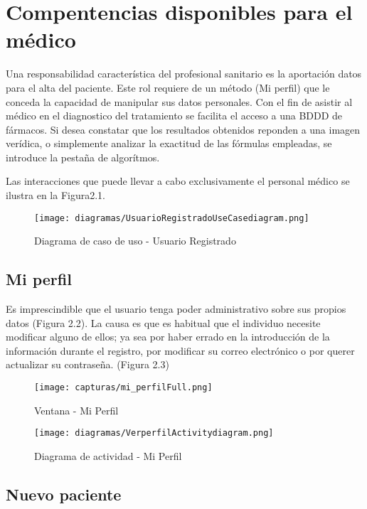 \documentclass[11pt,spanish,
		listoftables,listoffigures]
		{tfgplantilla}
\begin{document}
\section {Compentencias disponibles para el médico}
Una responsabilidad característica del profesional sanitario es la aportación datos para el alta del paciente. Este rol requiere de un método (Mi perfil) que le conceda la capacidad de manipular sus datos personales.
Con el fin de asistir al médico en el diagnostico del tratamiento se facilita el acceso a una BDDD de fármacos. Si desea constatar que los resultados obtenidos reponden a una imagen verídica, o simplemente analizar la exactitud de las fórmulas empleadas, se introduce la pestaña de algorítmos.

Las interacciones que puede llevar a cabo exclusivamente el personal médico se ilustra en la Figura2.1.

\newpage
\begin{landscape}
	\begin{figure}[H]
	\centering
	\texttt{[image: diagramas/UsuarioRegistradoUseCasediagram.png]}
	\caption{Diagrama de caso de uso - Usuario Registrado}
	\end{figure}
\end{landscape}


\vfill
\subsection {Mi perfil}

Es imprescindible que el usuario tenga poder administrativo sobre sus propios datos (Figura 2.2). La causa es que es habitual que el individuo necesite modificar alguno de ellos; ya sea por haber errado en la introducción de la información durante el registro, por modificar su correo electrónico o por querer actualizar su contraseña. (Figura 2.3)

\begin{figure}[H]
\centering
\texttt{[image: capturas/mi\_perfilFull.png]}
\caption{Ventana - Mi Perfil}
\end{figure}

\vfill
\begin{figure}[H]
\centering
\texttt{[image: diagramas/VerperfilActivitydiagram.png]}
\caption{Diagrama de actividad -  Mi Perfil}
\end{figure}

\vfill
\subsection {Nuevo paciente}
\end{document}

